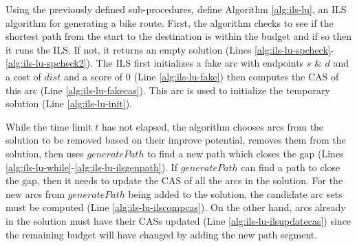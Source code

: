 \documentclass[honors]{union-cs-thesis}
\begin{document}
Using the previously defined sub-procedures, \citeauthor{lu2015arc} define Algorithm \ref{alg:ils-lu}, an ILS algorithm for generating a bike route. First, the algorithm checks to see if the shortest path from the start to the destination is within the budget and if so then it runs the ILS. If not, it returns an empty solution (Lines \ref{alg:ils-lu-spcheck}-\ref{alg:ils-lu-spcheck2}). The ILS first initializes a fake arc with endpoints $s$ \& $d$ and a cost of $dist$ and a score of 0 (Line \ref{alg:ils-lu-fake}) then computes the CAS of this arc (Line \ref{alg:ils-lu-fakecas}). This arc is used to initialize the temporary solution (Line \ref{alg:ils-lu-init}).

While the time limit $t$ has not elapsed, the algorithm chooses arcs from the solution to be removed based on their improve potential, removes them from the solution, then uses $generatePath$ to find a new path which closes the gap (Lines \ref{alg:ils-lu-while}-\ref{alg:ils-lu-ilsgenpath}). If $generatePath$ can find a path to close the gap, then it needs to update the CAS of all the arcs in the solution. For the new arcs from $generatePath$ being added to the solution, the candidate arc sets must be computed (Line \ref{alg:ils-lu-ilscompcas}). On the other hand, arcs already in the solution must have their CASs updated (Line \ref{alg:ils-lu-ilsupdatecas}) since the remaining budget will have changed by adding the new path segment. 
\end{document}

